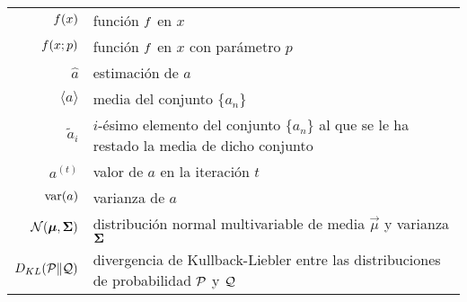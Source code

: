 \begin{longtable}{rp{}}
  $\mathnormal{f}(x)$     & función $\mathnormal{f}$ en $x$ \\
  $\mathnormal{f}(x;p)$   & función $\mathnormal{f}$ en $x$ con parámetro $p$\\
  $\hat{a}$         & estimación de $a$ \\
  $\langle{a}\rangle$ & media del conjunto $\{a_n\}$ \\
  $\tilde{a}_i$     & $i$-ésimo elemento del conjunto $\{a_n\}$ al que se le ha
    restado la media de dicho conjunto \\
  $a^{(t)}$         & valor de $a$ en la iteración $t$ \\
  $\operatorname*{var}(a)$         & varianza de $a$ \\
  $\mathcal{N}(\boldsymbol{\mu},\boldsymbol{\Sigma})$  & distribución normal multivariable de media
    $\vec{\mu}$ y varianza $\boldsymbol{\Sigma}$ \\
  $\mathnormal{D}_{KL}(\mathcal{P}\|\mathcal{Q})$ & divergencia de Kullback-Liebler entre
    las distribuciones de probabilidad $\mathcal{P}$ y $\mathcal{Q}$
\end{longtable}
